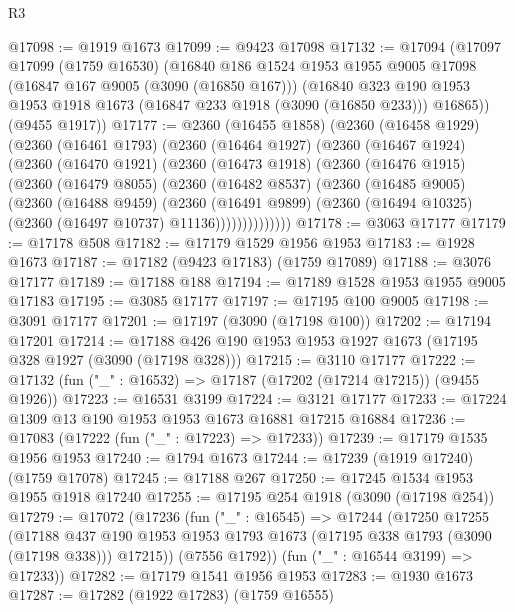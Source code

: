 \begin{lexlean}{R3}
\begin{coremodule}
@17098 := @1919 @1673
@17099 := @9423 @17098
@17132 := @17094
    (@17097
      @17099
      (@1759 @16530)
      (@16840
        @186
        @1524
        @1953
        @1955
        @9005
        @17098
        (@16847 @167 @9005 (@3090 (@16850 @167)))
        (@16840 @323 @190 @1953 @1953 @1918 @1673 (@16847 @233 @1918 (@3090 (@16850 @233))) @16865))
      (@9455 @1917))
@17177 := @2360
    (@16455 @1858)
    (@2360
      (@16458 @1929)
      (@2360
        (@16461 @1793)
        (@2360
          (@16464 @1927)
          (@2360
            (@16467 @1924)
            (@2360
              (@16470 @1921)
              (@2360
                (@16473 @1918)
                (@2360
                  (@16476 @1915)
                  (@2360
                    (@16479 @8055)
                    (@2360
                      (@16482 @8537)
                      (@2360
                        (@16485 @9005)
                        (@2360
                          (@16488 @9459)
                          (@2360
                            (@16491 @9899)
                            (@2360 (@16494 @10325) (@2360 (@16497 @10737) @11136))))))))))))))
@17178 := @3063 @17177
@17179 := @17178 @508
@17182 := @17179 @1529 @1956 @1953
@17183 := @1928 @1673
@17187 := @17182 (@9423 @17183) (@1759 @17089)
@17188 := @3076 @17177
@17189 := @17188 @188
@17194 := @17189 @1528 @1953 @1955 @9005 @17183
@17195 := @3085 @17177
@17197 := @17195 @100 @9005
@17198 := @3091 @17177
@17201 := @17197 (@3090 (@17198 @100))
@17202 := @17194 @17201
@17214 := @17188 @426 @190 @1953 @1953 @1927 @1673 (@17195 @328 @1927 (@3090 (@17198 @328)))
@17215 := @3110 @17177
@17222 := @17132 (fun ("_" : @16532) => @17187 (@17202 (@17214 @17215)) (@9455 @1926))
@17223 := @16531 @3199
@17224 := @3121 @17177
@17233 := @17224 @1309 @13 @190 @1953 @1953 @1673 @16881 @17215 @16884
@17236 := @17083 (@17222 (fun ("_" : @17223) => @17233))
@17239 := @17179 @1535 @1956 @1953
@17240 := @1794 @1673
@17244 := @17239 (@1919 @17240) (@1759 @17078)
@17245 := @17188 @267
@17250 := @17245 @1534 @1953 @1955 @1918 @17240
@17255 := @17195 @254 @1918 (@3090 (@17198 @254))
@17279 := @17072
    (@17236
      (fun ("_" : @16545) =>
      @17244
        (@17250
          @17255
          (@17188
            @437
            @190
            @1953
            @1953
            @1793
            @1673
            (@17195 @338 @1793 (@3090 (@17198 @338)))
            @17215))
        (@7556 @1792))
      (fun ("_" : @16544 @3199) => @17233))
@17282 := @17179 @1541 @1956 @1953
@17283 := @1930 @1673
@17287 := @17282 (@1922 @17283) (@1759 @16555)

\end{coremodule}
\end{lexlean}
